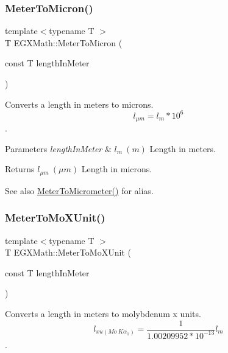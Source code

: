 \subsubsection{\texorpdfstring{Meter\+To\+Micron()}{MeterToMicron()}}
{\footnotesize\ttfamily template$<$typename T $>$ \\
T E\+G\+X\+Math\+::\+Meter\+To\+Micron (\begin{DoxyParamCaption}\item[{const T}]{length\+In\+Meter }\end{DoxyParamCaption})}



Converts a length in meters to microns. \[ l_{\mu m}=l_{m} * 10^{6} \]. 


\begin{DoxyParams}{Parameters}
{\em length\+In\+Meter} & $ l_{m}\ (m)$ Length in meters. \\
\hline
\end{DoxyParams}
\begin{DoxyReturn}{Returns}
$ l_{\mu m}\ (\mu m)$ Length in microns. 
\end{DoxyReturn}
\begin{DoxySeeAlso}{See also}
\mbox{\hyperlink{group___e_g_x_math-_conversions-_length_conversions-_meter-_s_i_gac0114c26af780ce603948df83f5e338e}{Meter\+To\+Micrometer()}} for alias. 
\end{DoxySeeAlso}
\mbox{\label{group___e_g_x_math-_conversions-_length_conversions-_meter-_non-_s_i_gae0351200a3d90c4efe741c6057b2fd4b}} 
\subsubsection{\texorpdfstring{Meter\+To\+Mo\+X\+Unit()}{MeterToMoXUnit()}}
{\footnotesize\ttfamily template$<$typename T $>$ \\
T E\+G\+X\+Math\+::\+Meter\+To\+Mo\+X\+Unit (\begin{DoxyParamCaption}\item[{const T}]{length\+In\+Meter }\end{DoxyParamCaption})}



Converts a length in meters to molybdenum x units. \[ l_{xu(Mo\ K\alpha_1)}=\frac{1}{1.00209952*10^{-13}} l_{m} \]. 


